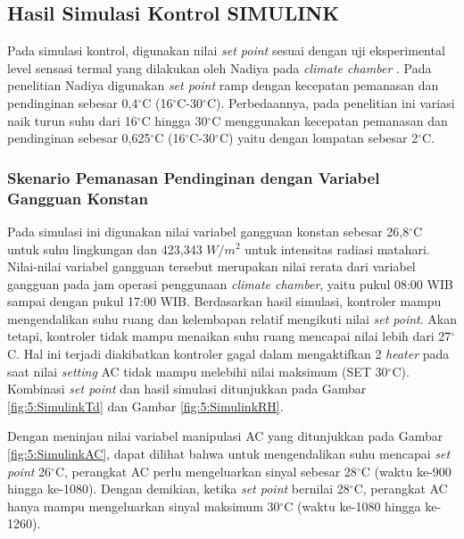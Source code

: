 \documentclass[a4paper,10pt]{article}
\newenvironment{body}{\begin{multicols}{2}}{\end{multicols}}
\begin{document}
\begin{body}
		\vspace{2mm}
				
		\subsection{Hasil Simulasi Kontrol SIMULINK}
		
		Pada simulasi kontrol, digunakan nilai \textit{set point} sesuai dengan uji eksperimental level sensasi termal yang dilakukan oleh Nadiya pada \textit{climate chamber} \cite{skripsiMuna}. Pada penelitian Nadiya digunakan \textit{set point} ramp dengan kecepatan pemanasan dan pendinginan sebesar 0,4$^{\circ}$C (16$^{\circ}$C-30$^{\circ}$C). Perbedaannya, pada penelitian ini variasi naik turun suhu dari 16$^\circ$C hingga 30$^\circ$C menggunakan kecepatan pemanasan dan pendinginan sebesar 0,625$^{\circ}$C (16$^{\circ}$C-30$^{\circ}$C) yaitu dengan lompatan sebesar 2$^\circ$C.\\
		
		\subsubsection{Skenario Pemanasan Pendinginan dengan Variabel Gangguan Konstan}
		
		Pada simulasi ini digunakan nilai variabel gangguan konstan sebesar 26,8$^\circ$C untuk suhu lingkungan dan 423,343 $W/m^2$ untuk intensitas radiasi matahari. Nilai-nilai variabel gangguan tersebut merupakan nilai rerata dari variabel gangguan pada jam operasi penggunaan \textit{climate chamber}, yaitu pukul 08:00 WIB sampai dengan pukul 17:00 WIB. Berdasarkan hasil simulasi, kontroler mampu mengendalikan suhu ruang dan kelembapan relatif mengikuti nilai \textit{set point}. Akan tetapi, kontroler tidak mampu menaikan suhu ruang mencapai nilai lebih dari 27$^\circ$C. Hal ini terjadi diakibatkan kontroler gagal dalam mengaktifkan 2 \textit{heater} pada saat nilai \textit{setting} AC tidak mampu melebihi nilai maksimum (SET 30$^\circ$C). Kombinasi \textit{set point} dan hasil simulasi ditunjukkan pada Gambar \ref{fig:5:SimulinkTd} dan Gambar \ref{fig:5:SimulinkRH}.
		
		Dengan meninjau nilai variabel manipulasi AC yang ditunjukkan pada Gambar \ref{fig:5:SimulinkAC}, dapat dilihat bahwa untuk mengendalikan suhu mencapai \textit{set point} 26$^\circ$C, perangkat AC perlu mengeluarkan sinyal sebesar 28$^\circ$C (waktu ke-900 hingga ke-1080). Dengan demikian, ketika \textit{set point} bernilai 28$^\circ$C, perangkat AC hanya mampu mengeluarkan sinyal maksimum 30$^\circ$C (waktu ke-1080 hingga ke-1260).
		

\end{body}
\end{document}
